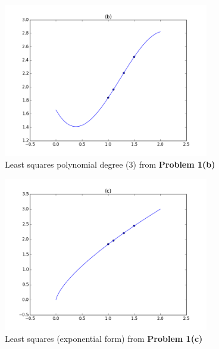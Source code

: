 \documentclass[10pt]{article}
\theoremstyle{plain}
\theoremstyle{definition}
\numberwithin{equation}{section}
\begin{document}
\begin{figure}[p]
    \begin{center}
        \includegraphics[width=0.8\textwidth]{p1_3}
        \caption{Least squares polynomial degree (3) from \textbf{Problem 1(b)}}
    \end{center}
\end{figure}

\begin{figure}[p]
    \begin{center}
        \includegraphics[width=0.8\textwidth]{p1_exp}
        \caption{Least squares (exponential form) from \textbf{Problem 1(c)}}
    \end{center}
\end{figure}
\end{document}
